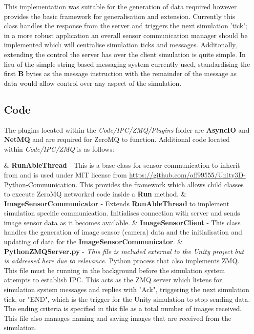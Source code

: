 \documentclass{article}
\begin{document}
This implementation was suitable for the generation of data required however provides the basic framework for generalisation and extension. Currently this class handles the response from the server and triggers the next simulation 'tick'; in a more robust application an overall sensor communication manager should be implemented which will centralise simulation ticks and messages. Additonally, extending the control the server has over the client simulation is quite simple. In lieu of the simple string based messaging system currently used, standardising the first \textbf{B} bytes as the message instruction with the remainder of the message as data would allow control over any aspect of the simulation. 


\subsection{Code}

The plugins located within the \textit{Code/IPC/ZMQ/Plugins} folder are \textbf{AsyncIO} and \textbf{NetMQ} and are required for ZeroMQ to function. Additional code located within \textit{Code/IPC/ZMQ} is as follows:

\begin{easylist}[itemize]
	& \textbf{RunAbleThread} - This is a base class for sensor communication to inherit from and is used under MIT license from \url{https://github.com/off99555/Unity3D-Python-Communication}. This provides the framework which allows child classes to execute ZeroMQ networked code inside a \textbf{Run} method.
	& \textbf{ImageSensorCommunicator} - Extends \textbf{RunAbleThread} to implement simulation specific communication. Initialises connection with server and sends image sensor data as it becomes available.
	& \textbf{ImageSensorClient} - This class handles the generation of image sensor (camera) data and the initialisation and updating of data for the \textbf{ImageSensorCommunicator}.
	& \textbf{PythonZMQServer.py} - \textit{This file is included external to the Unity project but is addressed here due to relevance.} Python process that also implements ZMQ. This file must be running in the background before the simulation system attempts to establish IPC. This acts as the ZMQ server which listens for simulation system messages and replies with "Ack", triggering the next simulation tick, or "END", which is the trigger for the Unity simulation to stop sending data. The ending criteria is specified in this file as a total number of images received. This file also manages naming and saving images that are received from the simulation. 
\end{easylist}
\end{document}
